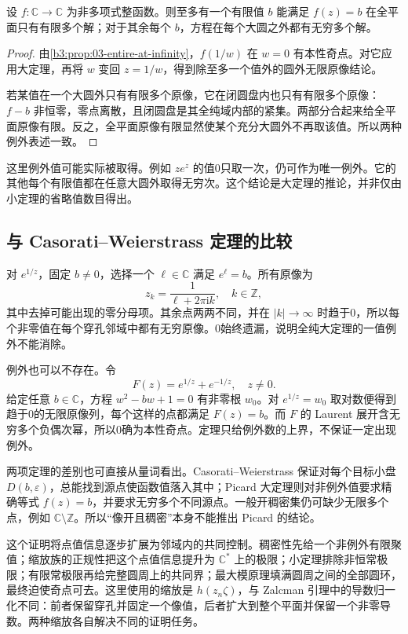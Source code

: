 \begin{corollary}[超越整函数的重复取值]\label{b3:cor:14-transcendental-values}
设 \(f:\mathbb C\to\mathbb C\) 为非多项式整函数。则至多有一个有限值 \(b\) 能满足 \(f(z)=b\) 在全平面只有有限多个解；对于其余每个 \(b\)，方程在每个大圆之外都有无穷多个解。
\end{corollary}
\begin{proof}
由\cref{b3:prop:03-entire-at-infinity}，\(f(1/w)\) 在 \(w=0\) 有本性奇点。对它应用大定理，再将 \(w\) 变回 \(z=1/w\)，得到除至多一个值外的圆外无限原像结论。

若某值在一个大圆外只有有限多个原像，它在闭圆盘内也只有有限多个原像：\(f-b\) 非恒零，零点离散，且闭圆盘是其全纯域内部的紧集。两部分合起来给全平面原像有限。反之，全平面原像有限显然使某个充分大圆外不再取该值。所以两种例外表述一致。
\end{proof}
这里例外值可能实际被取得。例如 \(ze^z\) 的值0只取一次，仍可作为唯一例外。它的其他每个有限值都在任意大圆外取得无穷次。这个结论是大定理的推论，并非仅由小定理的省略值数目得出。

\subsection{与 Casorati–Weierstrass 定理的比较}
\label{b3:subsec:140503}

对 \(e^{1/z}\)，固定 \(b\ne0\)，选择一个 \(\ell\in\mathbb C\) 满足 \(e^\ell=b\)。所有原像为
\[
 z_k=\frac1{\ell+2\pi\mathrm i k},\quad k\in\mathbb Z,
\]
其中去掉可能出现的零分母项。其余点两两不同，并在 \(|k|\to\infty\) 时趋于0，所以每个非零值在每个穿孔邻域中都有无穷原像。0始终遗漏，说明全纯大定理的一值例外不能消除。

\ProseParagraphBreak
例外也可以不存在。令
\[
 F(z)=e^{1/z}+e^{-1/z},\quad z\ne0.
\]
给定任意 \(b\in\mathbb C\)，方程 \(w^2-bw+1=0\) 有非零根 \(w_0\)。对 \(e^{1/z}=w_0\) 取对数便得到趋于0的无限原像列，每个这样的点都满足 \(F(z)=b\)。而 \(F\) 的 Laurent 展开含无穷多个负偶次幂，所以0确为本性奇点。定理只给例外数的上界，不保证一定出现例外。

\ProseParagraphBreak
两项定理的差别也可直接从量词看出。Casorati--Weierstrass 保证对每个目标小盘 \(D(b,\varepsilon)\)，总能找到源点使函数值落入其中；Picard 大定理则对非例外值要求精确等式 \(f(z)=b\)，并要求无穷多个不同源点。一般开稠密集仍可缺少无限多个点，例如 \(\mathbb C\setminus\mathbb Z\)。所以“像开且稠密”本身不能推出 Picard 的结论。

\ProseParagraphBreak
这个证明将点值信息逐步扩展为邻域内的共同控制。稠密性先给一个非例外有限聚值；缩放族的正规性把这个点值信息提升为 \(\mathbb C^*\) 上的极限；小定理排除非恒常极限；有限常极限再给完整圆周上的共同界；最大模原理填满圆周之间的全部圆环，最终迫使奇点可去。这里使用的缩放是 \(h(z_n\zeta)\)，与 Zalcman 引理中的导数归一化不同：前者保留穿孔并固定一个像值，后者扩大到整个平面并保留一个非零导数。两种缩放各自解决不同的证明任务。
